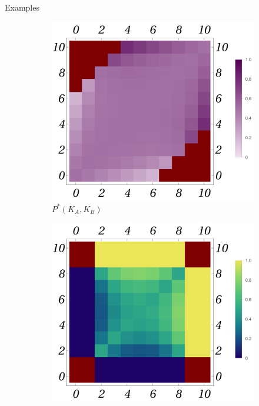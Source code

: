 \documentclass{beamer}
\theoremstyle{definition}
\begin{document}
\begin{frame}[shrink=15]{Examples}
    \begin{figure}[H]
    \centering
    \begin{subfigure}[b]{0.3\textwidth}
        \includegraphics[width=\textwidth]{img/PB_Plot_4_10.png}
        \caption{\small \centering $P^*(K_A,K_B)$}
        \label{fig:BGame4_10_P}
    \end{subfigure}
    \hfill %
    \begin{subfigure}[b]{0.3\textwidth}
        \includegraphics[width=\textwidth]{img/ppkB_Plot_4_10.png}

\end{subfigure}
\end{figure}
\end{frame}
\end{document}
